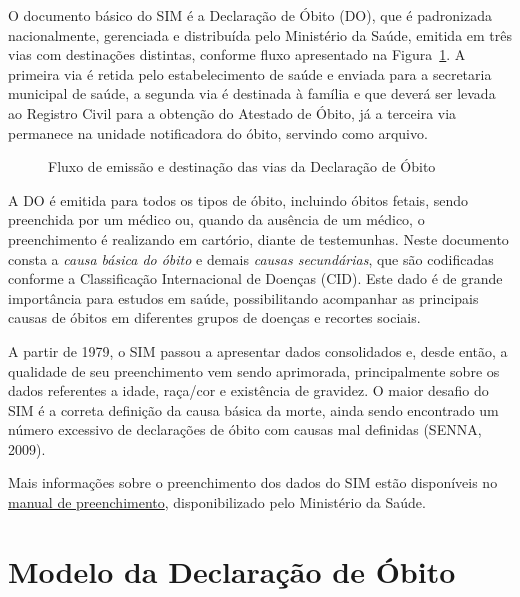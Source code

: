 \documentclass[
  letterpaper,
  DIV=11,
  numbers=noendperiod]{scrreprt}
\begin{document}
O documento básico do SIM é a Declaração de Óbito (DO), que é
padronizada nacionalmente, gerenciada e distribuída pelo Ministério da
Saúde, emitida em três vias com destinações distintas, conforme fluxo
apresentado na Figura~\ref{fig-do}. A primeira via é retida pelo
estabelecimento de saúde e enviada para a secretaria municipal de saúde,
a segunda via é destinada à família e que deverá ser levada ao Registro
Civil para a obtenção do Atestado de Óbito, já a terceira via permanece
na unidade notificadora do óbito, servindo como arquivo.

\begin{figure}


\caption{\label{fig-do}Fluxo de emissão e destinação das vias da
Declaração de Óbito}

\end{figure}%

A DO é emitida para todos os tipos de óbito, incluindo óbitos fetais,
sendo preenchida por um médico ou, quando da ausência de um médico, o
preenchimento é realizando em cartório, diante de testemunhas. Neste
documento consta a \emph{causa básica do óbito} e demais \emph{causas
secundárias}, que são codificadas conforme a Classificação Internacional
de Doenças (CID). Este dado é de grande importância para estudos em
saúde, possibilitando acompanhar as principais causas de óbitos em
diferentes grupos de doenças e recortes sociais.

A partir de 1979, o SIM passou a apresentar dados consolidados e, desde
então, a qualidade de seu preenchimento vem sendo aprimorada,
principalmente sobre os dados referentes a idade, raça/cor e existência
de gravidez. O maior desafio do SIM é a correta definição da causa
básica da morte, ainda sendo encontrado um número excessivo de
declarações de óbito com causas mal definidas (SENNA, 2009).

Mais informações sobre o preenchimento dos dados do SIM estão
disponíveis no
\href{assets/sim/declaracao-obito-manual-instrucoes-preenchimento.pdf}{manual
de preenchimento}, disponibilizado pelo Ministério da Saúde.

\section{Modelo da Declaração de
Óbito}\label{modelo-da-declarauxe7uxe3o-de-uxf3bito}
\end{document}
